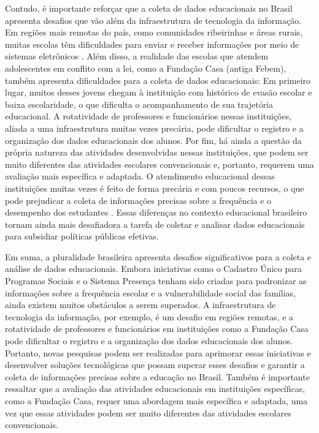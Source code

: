 Contudo, é importante reforçar que a coleta de dados educacionais no Brasil apresenta desafios que vão além da infraestrutura de tecnologia da informação. Em regiões mais remotas do país, como comunidades ribeirinhas e áreas rurais, muitas escolas têm dificuldades para enviar e receber informações por meio de sistemas eletrônicos \cite{Ribeirinhas:2021}. Além disso, a realidade das escolas que atendem adolescentes em conflito com a lei, como a Fundação Casa (antiga Febem), também apresenta dificuldades para a coleta de dados educacionais: Em primeiro lugar, muitos desses jovens chegam à instituição com histórico de evasão escolar e baixa escolaridade, o que dificulta o acompanhamento de sua trajetória educacional. A rotatividade de professores e funcionários nessas instituições, aliada a uma infraestrutura muitas vezes precária, pode dificultar o registro e a organização dos dados educacionais dos alunos. Por fim, há ainda a questão da própria natureza das atividades desenvolvidas nessas instituições, que podem ser muito diferentes das atividades escolares convencionais e, portanto, requerem uma avaliação mais específica e adaptada. O atendimento educacional dessas instituições muitas vezes é feito de forma precária e com poucos recursos, o que pode prejudicar a coleta de informações precisas sobre a frequência e o desempenho dos estudantes \cite{Morais2019}. Essas diferenças no contexto educacional brasileiro tornam ainda mais desafiadora a tarefa de coletar e analisar dados educacionais para subsidiar políticas públicas efetivas.

Em suma, a pluralidade brasileira apresenta desafios significativos para a coleta e análise de dados educacionais. Embora iniciativas como o Cadastro Único para Programas Sociais e o Sistema Presença tenham sido criadas para padronizar as informações sobre a frequência escolar e a vulnerabilidade social das famílias, ainda existem muitos obstáculos a serem superados. A infraestrutura de tecnologia da informação, por exemplo, é um desafio em regiões remotas, e a rotatividade de professores e funcionários em instituições como a Fundação Casa pode dificultar o registro e a organização dos dados educacionais dos alunos. Portanto, novas pesquisas podem ser realizadas para aprimorar essas iniciativas e desenvolver soluções tecnológicas que possam superar esses desafios e garantir a coleta de informações precisas sobre a educação no Brasil. Também é importante ressaltar que a avaliação das atividades educacionais em instituições específicas, como a Fundação Casa, requer uma abordagem mais específica e adaptada, uma vez que essas atividades podem ser muito diferentes das atividades escolares convencionais.




